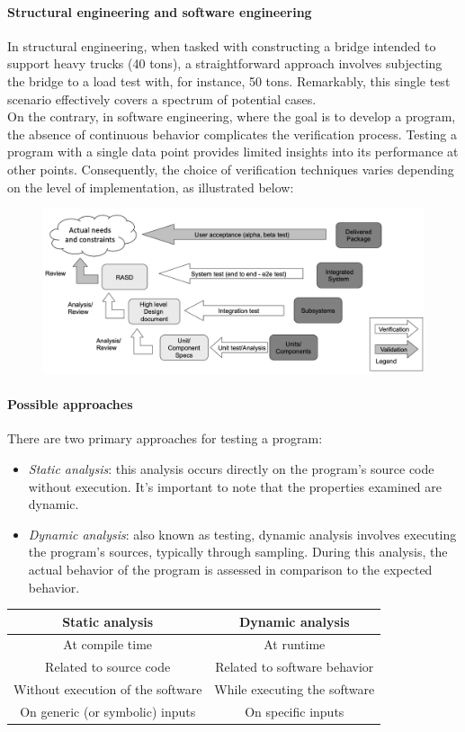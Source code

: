 \paragraph*{Structural engineering and software engineering}
In structural engineering, when tasked with constructing a bridge intended to support heavy trucks (40 tons), a straightforward approach involves subjecting the bridge to a load test with, for instance, 50 tons. 
Remarkably, this single test scenario effectively covers a spectrum of potential cases. \\
On the contrary, in software engineering, where the goal is to develop a program, the absence of continuous behavior complicates the verification process. 
Testing a program with a single data point provides limited insights into its performance at other points.
Consequently, the choice of verification techniques varies depending on the level of implementation, as illustrated below:
\begin{figure}[H]
    \centering
    \includegraphics[width=0.75\linewidth]{images/ver1.png}
\end{figure}

\paragraph*{Possible approaches}
There are two primary approaches for testing a program:
\begin{itemize}
    \item \textit{Static analysis}: this analysis occurs directly on the program's source code without execution. 
        It's important to note that the properties examined are dynamic.
    \item \textit{Dynamic analysis}: also known as testing, dynamic analysis involves executing the program's sources, typically through sampling. 
        During this analysis, the actual behavior of the program is assessed in comparison to the expected behavior.
\end{itemize}
\begin{table}[H]
    \centering
    \begin{tabular}{cc}
    \hline
    \textbf{Static analysis}          & \textbf{Dynamic analysis}    \\ \hline
    At compile time                   & At runtime                   \\
    Related to source code            & Related to software behavior \\
    Without execution of the software & While executing the software \\
    On generic (or symbolic) inputs   & On specific inputs           \\ \hline
    \end{tabular}
\end{table}
